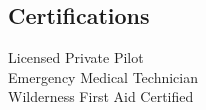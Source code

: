 \documentclass[letterpaper]{deedy-resume} %
\begin{document}
\begin{minipage}[t]{0.33\textwidth}
\sectionspace %


\subsection{Certifications}

Licensed Private Pilot \\ 
Emergency Medical Technician \\ 
Wilderness First Aid Certified \\

\sectionspace %












\end{minipage} %
\end{document}
